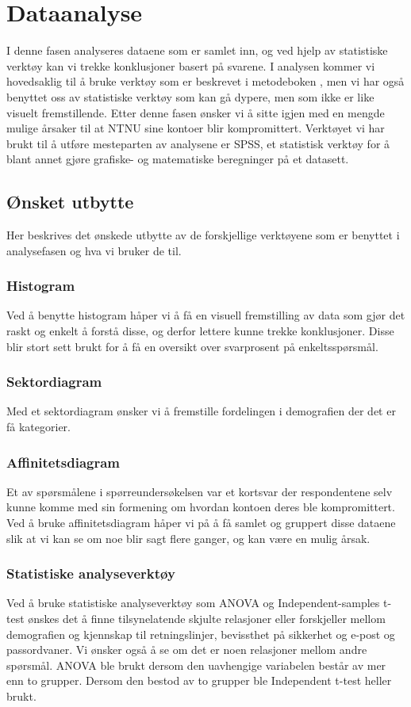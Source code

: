 \chapter{Dataanalyse}
I denne fasen analyseres dataene som er samlet inn, og ved hjelp av statistiske verktøy kan vi trekke konklusjoner basert på svarene. I analysen kommer vi hovedsaklig til å bruke verktøy som er beskrevet i metodeboken \cite{RCA}, men vi har også benyttet oss av statistiske verktøy som kan gå dypere, men som ikke er like visuelt fremstillende. Etter denne fasen ønsker vi å sitte igjen med en mengde mulige årsaker til at NTNU sine kontoer blir kompromittert. Verktøyet vi har brukt til å utføre mesteparten av analysene er SPSS, et statistisk verktøy for å blant annet gjøre grafiske- og matematiske beregninger på et datasett.

\section{Ønsket utbytte}
Her beskrives det ønskede utbytte av de forskjellige verktøyene som er benyttet i analysefasen og hva vi bruker de til.

\subsection{Histogram}
Ved å benytte histogram håper vi å få en visuell fremstilling av data som gjør det raskt og enkelt å forstå disse, og derfor lettere kunne trekke konklusjoner. Disse blir stort sett brukt for å få en oversikt over svarprosent på enkeltsspørsmål. 

\subsection{Sektordiagram}
Med et sektordiagram ønsker vi å fremstille fordelingen i demografien der det er få kategorier. 

\subsection{Affinitetsdiagram}
Et av spørsmålene i spørreundersøkelsen var et kortsvar der respondentene selv kunne komme med sin formening om hvordan kontoen deres ble kompromittert. Ved å bruke affinitetsdiagram håper vi på å få samlet og gruppert disse dataene slik at vi kan se om noe blir sagt flere ganger, og kan være en mulig årsak. 

\subsection{Statistiske analyseverktøy}
Ved å bruke statistiske analyseverktøy som ANOVA og Independent-samples t-test ønskes det å finne tilsynelatende skjulte relasjoner eller forskjeller mellom demografien og kjennskap til retningslinjer, bevissthet på sikkerhet og e-post og passordvaner. Vi ønsker også å se om det er noen relasjoner mellom andre spørsmål. ANOVA ble brukt dersom den uavhengige variabelen består av mer enn to grupper. Dersom den bestod av to grupper ble Independent t-test heller brukt.

